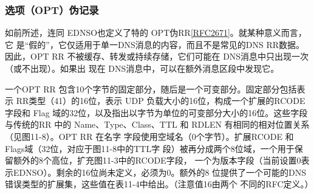 \subsubsection{选项（OPT）伪记录}

如前所述，连同 EDNSO也定义了特的 OPT伪RR\href{https://www.rfc-editor.org/rfc/rfc2671}{[RFC2671]}。就某种意义而言，它
是“假的”，它仅适用于单一DNS消息的内容，而且不是常见的DNS RR数据。因此，OPT
RR 不被缓存、转发或持续存储，它们可能在 DNS消息中只出现一次（或不出现）。如果出
现在 DNS消息中，可以在额外消息区段中发现它。

一个OPT RR 包含10个字节的固定部分，随后是一个可变部分。固定部分包括表示
RR类型（41）的16位，表示 UDP 负载大小的16位，构成一个扩展的RCODE 字段和 Flag
域的32位，以及指出以字节为单位的可变部分大小的16位。这些字段与传统的RR 中的
Name、Type、Class、TTL 和 RDLEN 有相同的相对位置关系（见图11-8）。OPT RR 在名字
字段使用空域名（0个字节）。扩展RCODE 和Flags域（32位，对应于图11-8中的TTL字
段）被再分成两个8位域，一个用于保留额外的8个高位，扩充图11-3中的RCODE字段，
一个为版本字段（当前设置0表示EDNSO）。剩余的16位尚未定义，必须为0。额外的8
位提供了一个可能的DNS错误类型的扩展集，这些值在表11-4中给出。（注意值16由两个
不同的RFC定义。）

